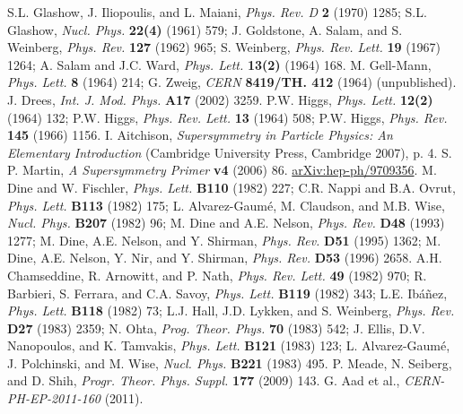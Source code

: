 \documentclass[12pt, letterpaper]{report}
\begin{document}
\begin{thebibliography}{99}
 S.L. Glashow, J. Iliopoulis, and L. Maiani, \textit{Phys. Rev. D} \textbf{2} (1970) 1285; S.L. Glashow, \textit{Nucl. Phys.} \textbf{22(4)} (1961) 579; J. Goldstone, A. Salam, and S. Weinberg, \textit{Phys. Rev.} \textbf{127} (1962) 965; S. Weinberg, \textit{Phys. Rev. Lett.} \textbf{19} (1967) 1264; A. Salam and J.C. Ward, \textit{Phys. Lett.} \textbf{13(2)} (1964) 168.
 M. Gell-Mann, \textit{Phys. Lett.} \textbf{8} (1964) 214; G. Zweig, \textit{CERN} \textbf{8419/TH. 412} (1964) (unpublished).
 J. Drees, \textit{Int. J. Mod. Phys.} \textbf{A17} (2002) 3259.
 P.W. Higgs, \textit{Phys. Lett.} \textbf{12(2)} (1964) 132; P.W. Higgs, \textit{Phys. Rev. Lett.} \textbf{13} (1964) 508; P.W. Higgs, \textit{Phys. Rev.} \textbf{145} (1966) 1156.
 I. Aitchison, \textit{Supersymmetry in Particle Physics: An Elementary Introduction} (Cambridge University Press, Cambridge 2007), p. 4.
 S. P. Martin, \textit{A Supersymmetry Primer} \textbf{v4} (2006) 86.  \href{http://arxiv.org/abs/hep-ph/9709356}{arXiv:hep-ph/9709356}.
 M. Dine and W. Fischler, \textit{Phys. Lett.} \textbf{B110} (1982) 227; C.R. Nappi and B.A. Ovrut, \textit{Phys. Lett.} \textbf{B113} (1982) 175; L. Alvarez-Gaum\'e, M. Claudson, and M.B. Wise, \textit{Nucl. Phys.} \textbf{B207} (1982) 96; M. Dine and A.E. Nelson, \textit{Phys. Rev.} \textbf{D48} (1993) 1277; M. Dine, A.E. Nelson, and Y. Shirman, \textit{Phys. Rev.} \textbf{D51} (1995) 1362; M. Dine, A.E. Nelson, Y. Nir, and Y. Shirman, \textit{Phys. Rev.} \textbf{D53} (1996) 2658.
 A.H. Chamseddine, R. Arnowitt, and P. Nath, \textit{Phys. Rev. Lett.} \textbf{49} (1982) 970; R. Barbieri, S. Ferrara, and C.A. Savoy, \textit{Phys. Lett.} \textbf{B119} (1982) 343; L.E. Ib\'a\~{n}ez, \textit{Phys. Lett.} \textbf{B118} (1982) 73; L.J. Hall, J.D. Lykken, and S. Weinberg, \textit{Phys. Rev.} \textbf{D27} (1983) 2359; N. Ohta, \textit{Prog. Theor. Phys.} \textbf{70} (1983) 542; J. Ellis, D.V. Nanopoulos, and K. Tamvakis, \textit{Phys. Lett.} \textbf{B121} (1983) 123; L. Alvarez-Gaum\'e, J. Polchinski, and M. Wise, \textit{Nucl. Phys.} \textbf{B221} (1983) 495.
 P. Meade, N. Seiberg, and D. Shih, \textit{Progr. Theor. Phys. Suppl.} \textbf{177} (2009) 143.
 G. Aad et al., \textit{CERN-PH-EP-2011-160} (2011).

\end{thebibliography}
\end{document}
